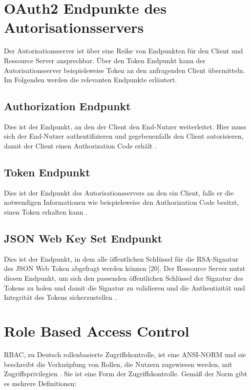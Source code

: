 \section{OAuth2 Endpunkte des Autorisationsservers}
\label{sec:OAuth2EndpunktedesAutorisationsservers}

Der Autorisationsserver ist über eine Reihe von Endpunkten für den Client und Ressource Server ansprechbar. Über den Token 
Endpunkt kann der Autorisationsserver beispielsweise Token an den anfragenden Client 
übermitteln. Im Folgenden werden die relevanten Endpunkte erläutert.

\subsection{Authorization Endpunkt}
\label{sec:OAuth2EndpunktedesAutorisationsservers:AuthorizationEndpunkt}
Dies ist der Endpunkt, an den der Client den End-Nutzer weiterleitet. Hier muss sich der 
End-Nutzer authentifizieren und gegebenenfalls den Client autorisieren, damit der Client einen Authorization Code erhält \citep{oauth2:2012}.

\subsection{Token Endpunkt}
\label{sec:OAuth2EndpunktedesAutorisationsservers:TokenEndpunkt}
Dies ist der Endpunkt des Autorisationsservers an den ein Client, falls er die notwendigen 
Informationen wie beispielsweise den Authorization Code besitzt, einen Token erhalten 
kann \citep{oauth2:2012}.

\subsection{JSON Web Key Set Endpunkt}
\label{sec:OAuth2EndpunktedesAutorisationsservers:JSONWebKeySet(JWKS)Endpunkt}
Dies ist der Endpunkt, in dem alle öffentlichen Schlüssel für die \ac{RSA}-Signatur des JSON Web 
Token abgefragt werden können [20]. Der Ressource Server nutzt diesen Endpunkt, um sich 
den passenden öffentlichen Schlüssel der Signatur des Tokens zu holen und damit die 
Signatur zu validieren und die Authentizität und Integrität des Tokens sicherzustellen \citep{jwk:2015}.

\section{Role Based Access Control}
\label{sec:Zugriffskontrolle:RoleBasedAccessControl(RBAC)}
\ac{RBAC}, zu Deutsch rollenbasierte Zugriffskontrolle, ist eine ANSI-NORM 
und sie beschreibt die Verknüpfung von Rollen, die Nutzern zugewiesen werden, mit 
Zugriffsprivilegien \citep{rbac:2006}. Sie ist eine Form der Zugriffskontrolle. Gemäß der Norm gibt es mehrere Definitionen:

